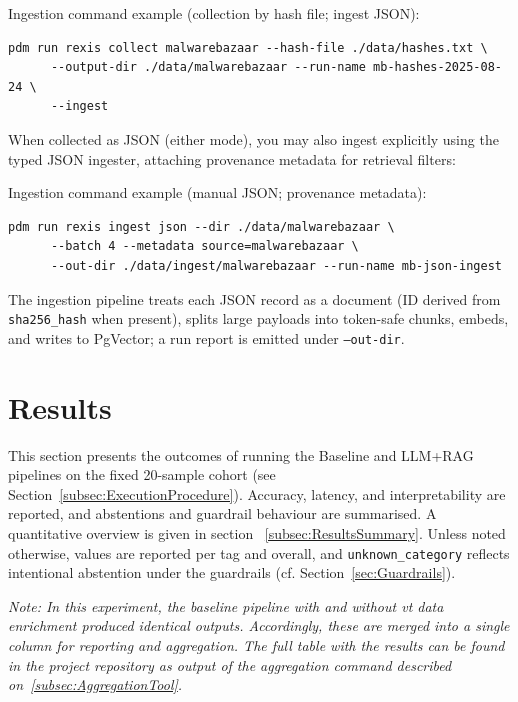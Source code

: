 Ingestion command example (collection by hash file; ingest JSON):
\begin{verbatim}
pdm run rexis collect malwarebazaar --hash-file ./data/hashes.txt \
      --output-dir ./data/malwarebazaar --run-name mb-hashes-2025-08-24 \
      --ingest
\end{verbatim}

When collected as JSON (either mode), you may also ingest explicitly using the typed JSON ingester,
attaching provenance metadata for retrieval filters:

Ingestion command example (manual JSON; provenance metadata):
\begin{verbatim}
pdm run rexis ingest json --dir ./data/malwarebazaar \
      --batch 4 --metadata source=malwarebazaar \
      --out-dir ./data/ingest/malwarebazaar --run-name mb-json-ingest
\end{verbatim}

The ingestion pipeline treats each JSON record as a document (ID derived from \texttt{sha256\_hash}
when present), splits large payloads into token-safe chunks, embeds, and writes to PgVector; a run
report is emitted under \texttt{--out-dir}.

\section{Results}\label{sec:Results}
This section presents the outcomes of running the Baseline and LLM+RAG pipelines on the fixed
20-sample cohort (see Section~\ref{subsec:ExecutionProcedure}). Accuracy, latency, and
interpretability are reported, and abstentions and guardrail behaviour are summarised. A
quantitative overview is given in section ~\ref{subsec:ResultsSummary}. Unless noted otherwise,
values are reported per tag and overall, and \texttt{unknown\_category} reflects intentional
abstention under the guardrails (cf. Section~\ref{sec:Guardrails}).

\vspace{0.5em}
\noindent\textit{Note: In this experiment, the baseline pipeline with and without \gls{vt} data
      enrichment produced identical outputs. Accordingly, these are merged into a single column for
      reporting and aggregation. The full table with the results can be found in the project
      repository as output of the aggregation command described on~\ref{subsec:AggregationTool}.}

